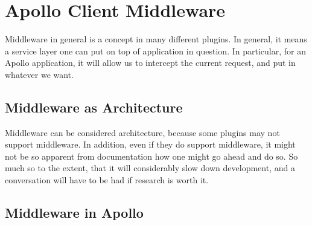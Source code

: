 \maketitle{}
\section{ Apollo Client Middleware }

Middleware in general is a concept in many different plugins. In general, it
means a service layer one can put on top of application in question. In
particular, for an Apollo application, it will allow us to intercept the
current request, and put in whatever we want.

\subsection{ Middleware as Architecture }
Middleware can be considered architecture, because some plugins may not support
middleware. In addition, even if they do support middleware, it might not be so
apparent from documentation how one might go ahead and do so. So much so to the
extent, that it will considerably slow down development, and a conversation will
have to be had if research is worth it.

\subsection{ Middleware in Apollo }
